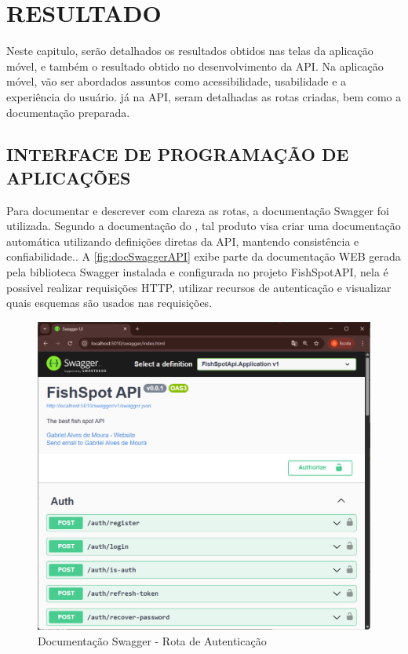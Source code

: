 
\chapter{RESULTADO}
\label{chap:introducao}

Neste capitulo, serão detalhados os resultados obtidos nas telas da aplicação móvel, e também o resultado obtido no desenvolvimento da API. Na aplicação móvel, vão ser abordados assuntos como acessibilidade, usabilidade e a experiência do usuário. já na API, seram detalhadas as rotas criadas, bem como a documentação preparada.

\section{INTERFACE DE PROGRAMAÇÃO DE APLICAÇÕES}
\label{sec:resultadoApi}

Para documentar e descrever com clareza as rotas, a documentação Swagger foi utilizada. Segundo a documentação do , tal produto visa criar uma documentação automática utilizando definições diretas da API, mantendo consistência e confiabilidade.. A \autoref{fig:docSwaggerAPI} exibe parte da documentação WEB gerada pela biblioteca Swagger instalada e configurada no projeto FishSpotAPI, nela é possivel realizar requisições HTTP, utilizar recursos de autenticação e visualizar quais esquemas são usados nas requisições.

\begin{figure}[H]
    \centering
    \caption{Documentação Swagger - Rota de Autenticação}
    \label{fig:docSwaggerAPI}
    \includegraphics[scale=0.53]{./dados/figuras/api-swagger.png}
\end{figure}

